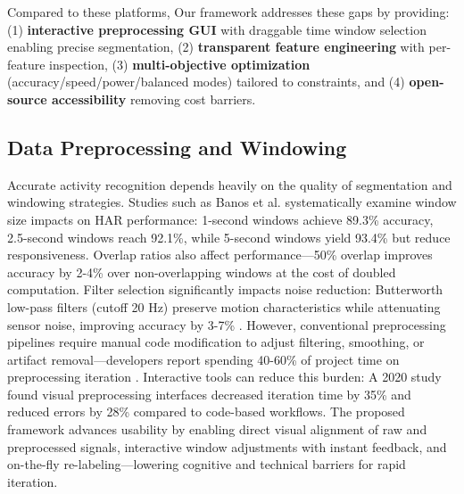 Compared to these platforms, Our framework addresses these gaps by providing: (1) \textbf{interactive preprocessing GUI} with draggable time window selection enabling precise segmentation, (2) \textbf{transparent feature engineering} with per-feature inspection, (3) \textbf{multi-objective optimization} (accuracy/speed/power/balanced modes) tailored to constraints, and (4) \textbf{open-source accessibility} removing cost barriers.

\subsection{Data Preprocessing and Windowing}
Accurate activity recognition depends heavily on the quality of segmentation and windowing strategies. Studies such as Banos et al. \cite{banos2014wisdm} systematically examine window size impacts on HAR performance: 1-second windows achieve 89.3\% accuracy, 2.5-second windows reach 92.1\%, while 5-second windows yield 93.4\% but reduce responsiveness. Overlap ratios also affect performance---50\% overlap improves accuracy by 2-4\% over non-overlapping windows \cite{wan2021deep_har_review} at the cost of doubled computation. Filter selection significantly impacts noise reduction: Butterworth low-pass filters (cutoff 20 Hz) preserve motion characteristics while attenuating sensor noise, improving accuracy by 3-7\% \cite{filippeschi2017survey_imu}. However, conventional preprocessing pipelines require manual code modification to adjust filtering, smoothing, or artifact removal---developers report spending 40-60\% of project time on preprocessing iteration \cite{merenda2020edge}. Interactive tools can reduce this burden: A 2020 study \cite{amershi2014power} found visual preprocessing interfaces decreased iteration time by 35\% and reduced errors by 28\% compared to code-based workflows. The proposed framework advances usability by enabling direct visual alignment of raw and preprocessed signals, interactive window adjustments with instant feedback, and on-the-fly re-labeling---lowering cognitive and technical barriers for rapid iteration.


